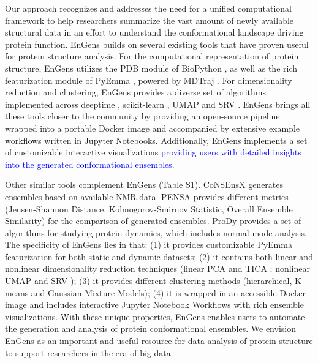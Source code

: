 \documentclass[unnumsec,webpdf,contemporary,large,numsquare]{oup-authoring-template}%
\theoremstyle{thmstyleone}%
\theoremstyle{thmstyletwo}%
\theoremstyle{thmstylethree}%
\begin{document}
Our approach recognizes and addresses the need for a unified computational framework to help researchers summarize the vast amount of newly available structural data in an effort to understand the conformational landscape driving protein function. EnGens builds on several existing tools that have proven useful for protein structure analysis. For the computational representation of protein structure, EnGens utilizes the PDB module of BioPython \citep{cock_biopython_2009}, as well as the rich featurization module of PyEmma \citep{scherer_pyemma_2015}, powered by MDTraj \citep{mcgibbon_mdtraj_2015}. For dimensionality reduction and clustering, EnGens provides a diverse set of algorithms implemented across deeptime \citep{hoffmann_deeptime_2021}, scikit-learn \citep{pedregosa_scikit-learn_2011}, UMAP \citep{trozzi_umap_2021} and SRV \citep{chen_nonlinear_2019}. EnGens brings all these tools closer to the community by providing an open-source pipeline wrapped into a portable Docker image and accompanied by extensive example workflows written in Jupyter Notebooks. Additionally, EnGens implements a set of customizable interactive visualizations \textcolor{blue}{providing users with detailed insights into the generated conformational ensembles.}

Other similar tools complement EnGens (Table S1). CoNSEnsX \citep{angyan_consensx_2010} generates ensembles based on available NMR data. PENSA \citep{vogele_systematic_2022, vogele_drorlabpensa_2022} provides different metrics (Jensen-Shannon Distance, Kolmogorov-Smirnov Statistic, Overall Ensemble Similarity) for the comparison of generated ensembles. ProDy \citep{bakan_prody_2011, zhang_prody_2021} provides a set of algorithms for studying protein dynamics, which includes normal mode analysis. The specificity of EnGens lies in that: (1) it provides customizable PyEmma featurization for both static and dynamic datasets; (2) it contains both linear and nonlinear dimensionality reduction techniques (linear PCA \citep{pearson_liii_1901} and TICA \citep{perez-hernandez_identification_2013, schwantes_modeling_2015}; nonlinear UMAP \citep{trozzi_umap_2021} and SRV \citep{chen_nonlinear_2019}); (3) it provides different clustering methods (hierarchical, K-means and Gaussian Mixture Models); (4) it is wrapped in an accessible Docker image and includes interactive Jupyter Notebook Workflows with rich ensemble visualizations. With these unique properties, EnGens enables users to automate the generation and analysis of protein conformational ensembles. We envision EnGens as an important and useful resource for data analysis of protein structure to support researchers in the era of big data.
\end{document}
